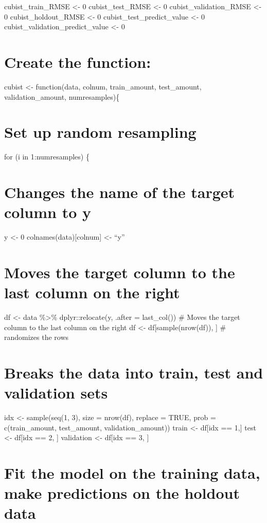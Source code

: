 \documentclass[
]{book}
\begin{document}
cubist\_train\_RMSE \textless- 0 cubist\_test\_RMSE \textless- 0 cubist\_validation\_RMSE
\textless- 0 cubist\_holdout\_RMSE \textless- 0 cubist\_test\_predict\_value \textless- 0
cubist\_validation\_predict\_value \textless- 0

\chapter{Create the function:}\label{create-the-function-2}

cubist \textless- function(data, colnum, train\_amount, test\_amount,
validation\_amount, numresamples)\{

\chapter{Set up random resampling}\label{set-up-random-resampling-2}

for (i in 1:numresamples) \{

\chapter{Changes the name of the target column to y}\label{changes-the-name-of-the-target-column-to-y-2}

y \textless- 0 colnames(data){[}colnum{]} \textless- ``y''

\chapter{Moves the target column to the last column on the right}\label{moves-the-target-column-to-the-last-column-on-the-right-2}

df \textless- data \%\textgreater\% dplyr::relocate(y, .after = last\_col()) \# Moves the
target column to the last column on the right df \textless-
df{[}sample(nrow(df)), {]} \# randomizes the rows

\chapter{Breaks the data into train, test and validation sets}\label{breaks-the-data-into-train-test-and-validation-sets-2}

idx \textless- sample(seq(1, 3), size = nrow(df), replace = TRUE, prob =
c(train\_amount, test\_amount, validation\_amount)) train \textless- df{[}idx == 1,{]} test \textless- df{[}idx == 2, {]} validation \textless- df{[}idx == 3, {]}

\chapter{Fit the model on the training data, make predictions on the holdout data}\label{fit-the-model-on-the-training-data-make-predictions-on-the-holdout-data}
\end{document}
